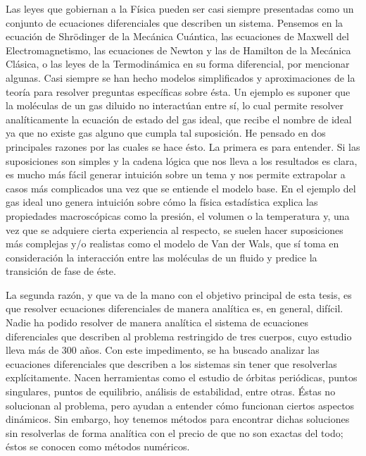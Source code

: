 Las leyes que gobiernan a la Física pueden ser casi siempre presentadas como un conjunto de ecuaciones diferenciales que describen un sistema. Pensemos en la ecuación de Shrödinger de la Mecánica Cuántica, las ecuaciones de Maxwell del Electromagnetismo, las ecuaciones de Newton y las de Hamilton de la Mecánica Clásica, o las leyes de la Termodinámica en su forma diferencial, por mencionar algunas. Casi siempre se han hecho modelos simplificados y aproximaciones de la teoría para resolver preguntas específicas sobre ésta. Un ejemplo es suponer que la moléculas de un gas diluido no interactúan entre sí, lo cual permite resolver analíticamente la ecuación de estado del gas ideal, que recibe el nombre de ideal ya que no existe gas alguno que cumpla tal suposición. He pensado en dos principales razones por las cuales se hace ésto. La primera es para entender. Si las suposiciones son simples y la cadena lógica que nos lleva a los resultados es clara, es mucho más fácil generar intuición sobre un tema y nos permite extrapolar a casos más complicados una vez que se entiende el modelo base. En el ejemplo del gas ideal uno genera intuición sobre cómo la física estadística explica las propiedades macroscópicas como la presión, el volumen o la temperatura y, una vez que se adquiere cierta experiencia al respecto, se suelen hacer suposiciones más complejas y/o realistas como el modelo de Van der Wals, que sí toma en consideración la interacción entre las moléculas de un fluido y predice la transición de fase de éste.

La segunda razón, y que va de la mano con el objetivo principal de esta tesis, es que resolver ecuaciones diferenciales de manera analítica es, en general, difícil. Nadie ha podido resolver de manera analítica el sistema de ecuaciones diferenciales que describen al problema restringido de tres cuerpos, cuyo estudio lleva más de 300 años. Con este impedimento, se ha buscado analizar las ecuaciones diferenciales que describen a los sistemas sin tener que resolverlas explícitamente. Nacen herramientas como el estudio de órbitas periódicas, puntos singulares, puntos de equilibrio, análisis de estabilidad, entre otras. Éstas no solucionan al problema, pero ayudan a entender cómo funcionan ciertos aspectos dinámicos. Sin embargo, hoy tenemos métodos para encontrar dichas soluciones sin resolverlas de forma analítica con el precio de que no son exactas del todo; éstos se conocen como métodos numéricos. 

